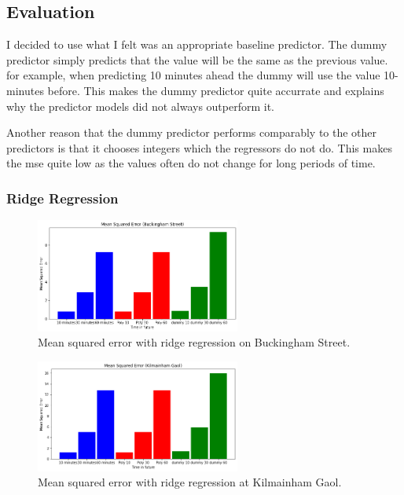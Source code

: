 \subsection{Evaluation}
I decided to use what I felt was an appropriate baseline predictor.
The dummy predictor simply predicts that the value will be the same as the previous value.
for example, when predicting 10 minutes ahead the dummy will use the value 10-minutes before.
This makes the dummy predictor quite accurrate and explains why the predictor models did not always outperform it.
\par 
Another reason that the dummy predictor performs comparably to the other predictors is that it chooses integers which the regressors do not do.
This makes the mse quite low as the values often do not change for long periods of time.

\subsubsection{Ridge Regression}
\begin{figure}[H]
    \centering
    \includegraphics[width=0.6\textwidth]{images/mse1.png}
    \caption{Mean squared error with ridge regression on Buckingham Street.}
    \end{figure}
\par
\begin{figure}[H]
    \centering
    \includegraphics[width=0.6\textwidth]{images/mse2.png}
    \caption{Mean squared error with ridge regression at Kilmainham Gaol.}
    \end{figure}
\par

